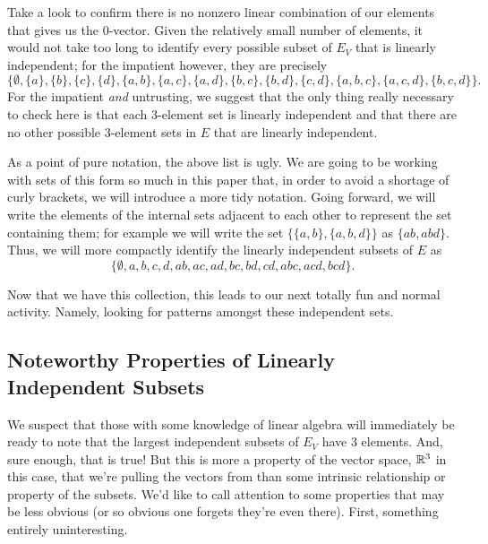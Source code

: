 \documentclass[12pt,oneside]{../../sfsuthesis}
\begin{document}
Take a look to confirm there is no nonzero linear combination of our elements that gives us the \( 0 \)-vector.
Given the relatively small number of elements, it would not take too long to identify every possible subset of \( E_V \) that is linearly independent;
for the impatient however, they are precisely
\[
    \big\{
    \emptyset,
    \{ a \},  \{ b \},  \{ c \},  \{ d \},
    \{ a,b \},  \{ a,c \},  \{ a,d \},  \{ b,c \},  \{ b,d \}, \{ c, d \},
    \{ a, b, c \},  \{ a, c, d \}, \{ b, c, d\}
    \big\}.
\]
For the impatient \emph{and} untrusting, we suggest that the only thing really necessary to check here is that each 3-element set is linearly independent and that there are no other possible 3-element sets in \( E \) that are linearly independent.

As a point of pure notation, the above list is ugly.
We are going to be working with sets of this form so much in this paper that, in order to avoid a shortage of curly brackets, we will introduce a more tidy notation.
Going forward, we will write the elements of the internal sets adjacent to each other to represent the set containing them; for example we will write the set \( \big\{ \{ a, b \}, \{ a, b, d \} \big\} \) as \( \{ ab, abd \} \).
Thus, we will more compactly identify the linearly independent subsets of \( E \) as
\[
    \{
    \emptyset,
    a, b, c, d,
    ab, ac, ad, bc, bd, cd,
    abc, acd, bcd
    \}.
\]

Now that we have this collection,
this leads to our next totally fun and normal activity.
Namely, looking for patterns amongst these independent sets.

\subsection{Noteworthy Properties of Linearly Independent Subsets}

We suspect that those with some knowledge of linear algebra will immediately be ready to note that the largest independent subsets of \( E_V \) have 3 elements.
And, sure enough, that is true!
But this is more a property of the vector space, \( \mathbb{R}^3 \) in this case, that we're pulling the vectors from than some intrinsic relationship or property of the subsets.
We'd like to call attention to some properties that may be less obvious (or so obvious one forgets they're even there).
First, something entirely uninteresting.
\end{document}
